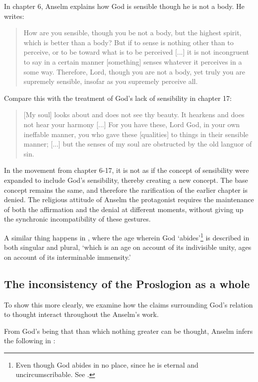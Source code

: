 \documentclass[]{amsart}
\begin{document}
In chapter 6, Anselm explains how God is sensible though he is not a body. He writes:

\begin{quote}
How are you sensible, though you be not a body, but the highest spirit, which is better than a body? But if to sense is nothing other than to perceive, or to be toward what is to be perceived [...] it is not incongruent to say in a certain manner [something] senses whatever it perceives in a some way. Therefore, Lord, though you are not a body, yet truly you are supremely sensible, insofar as you supremely perceive all. \cite[Pros. 6]{AnselmPros}
\end{quote}
Compare this with the treatment of God's lack of sensibility in chapter 17:

\begin{quote}
[My soul] looks about and does not see thy beauty. It hearkens and does not hear your harmony [...] For you have these, Lord God, in your own ineffable manner, you who gave these [qualities] to things in their sensible manner; [...] but the senses of my soul are obstructed by the old languor of sin. \cite[Pros. 17.]{AnselmPros}
\end{quote}

In the movement from chapter 6-17, it is not as if the concept of sensibility were expanded to include God's sensibility, thereby creating a new concept. The base concept remains the same, and therefore the rarification of the earlier chapter is denied. The religious attitude of Anselm the protagonist requires the maintenance of both the affirmation and the denial at different moments, without giving up the synchronic incompatibility of these gestures.

A similar thing happens in \cite[Pros. 21]{AnselmPros}, where the age wherein God `abides'\footnote{Even though God abides in no place, since he is eternal and uncircumscribable. See \cite[Pros. 19]{AnselmPros}.}  is described in both singular and plural, `which is an age on account of its indivisible unity, ages on account of its interminable immensity.' 

\subsection{The inconsistency of the Proslogion as a whole}
To show this more clearly, we examine how the claims surrounding God's relation to thought interact throughout the Anselm's work. 

From God's being that than which nothing greater can be thought, Anselm infers the following in \cite[Pros. 15]{AnselmPros}:
\end{document}

